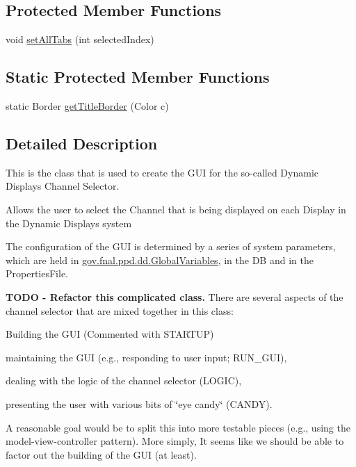 \subsection*{Protected Member Functions}
\begin{DoxyCompactItemize}
\item 
void \hyperlink{classgov_1_1fnal_1_1ppd_1_1dd_1_1ChannelSelector_abba1a8a5599959eb2e7a905f6bfd1685}{set\-All\-Tabs} (int selected\-Index)
\end{DoxyCompactItemize}
\subsection*{Static Protected Member Functions}
\begin{DoxyCompactItemize}
\item 
static Border \hyperlink{classgov_1_1fnal_1_1ppd_1_1dd_1_1ChannelSelector_a984845b48df72e93fb62ca3d36701ba4}{get\-Title\-Border} (Color c)
\end{DoxyCompactItemize}


\subsection{Detailed Description}
This is the class that is used to create the G\-U\-I for the so-\/called Dynamic Displays Channel Selector. 

Allows the user to select the Channel that is being displayed on each Display in the Dynamic Displays system 

The configuration of the G\-U\-I is determined by a series of system parameters, which are held in \hyperlink{classgov_1_1fnal_1_1ppd_1_1dd_1_1GlobalVariables}{gov.\-fnal.\-ppd.\-dd.\-Global\-Variables}, in the D\-B and in the Properties\-File. 

{\bfseries T\-O\-D\-O -\/ Refactor this complicated class.} There are several aspects of the channel selector that are mixed together in this class\-: 
\begin{DoxyItemize}
\item Building the G\-U\-I (Commented with S\-T\-A\-R\-T\-U\-P) 
\item maintaining the G\-U\-I (e.\-g., responding to user input; R\-U\-N\-\_\-\-G\-U\-I), 
\item dealing with the logic of the channel selector (L\-O\-G\-I\-C), 
\item presenting the user with various bits of \char`\"{}eye candy\char`\"{} (C\-A\-N\-D\-Y). 
\end{DoxyItemize}A reasonable goal would be to split this into more testable pieces (e.\-g., using the model-\/view-\/controller pattern). More simply, It seems like we should be able to factor out the building of the G\-U\-I (at least). 

